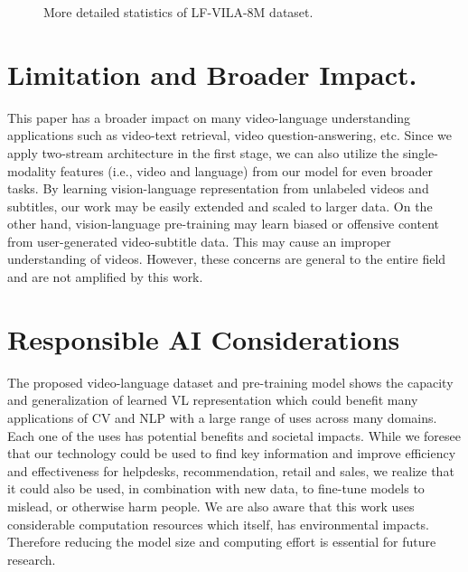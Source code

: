 \documentclass{article}
\begin{document}
\begin{figure}[t]
    \centering
    \hfill
    \hfill
\caption{More detailed statistics of LF-VILA-8M dataset.}
\label{fig:lfvila_statistics}
\end{figure}


\section{Limitation and Broader Impact.}\label{sec:limitation}
This paper has a broader impact on many video-language understanding applications such as video-text retrieval, video question-answering, etc. Since we apply two-stream architecture in the first stage, we can also utilize the single-modality features (i.e., video and language) from our model for even broader tasks. By learning vision-language representation from unlabeled videos and subtitles, our work may be easily extended and scaled to larger data.
On the other hand, vision-language pre-training may learn biased or offensive content from user-generated video-subtitle data. This may cause an improper understanding of videos. However, these concerns are general to the entire field and are not amplified by this work.

\section{Responsible AI Considerations} \label{sec:rai}
The proposed video-language dataset and pre-training model shows the capacity and generalization of learned VL representation which could benefit many applications of CV and NLP with a large range of uses across many domains. Each one of the uses has potential benefits and societal impacts. While we foresee that our technology could be used to find key information and improve efficiency and effectiveness for helpdesks, recommendation, retail and sales, we realize that it could also be used, in combination with new data, to fine-tune models to mislead, or otherwise harm people. We are also aware that this work uses considerable computation resources which itself, has environmental impacts. Therefore reducing the model size and computing effort is essential for future research.
\end{document}
